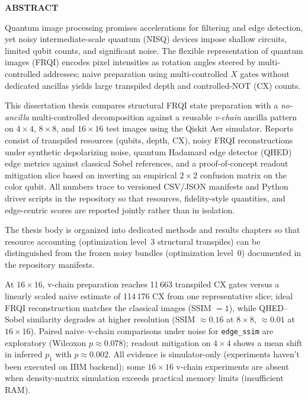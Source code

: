 \thispagestyle{abstractpagestyle}

\vspace*{36pt}

\begin{center}
    \textbf{\fontsize{20pt}{24pt} \selectfont ABSTRACT}
\end{center}

\vspace{24pt}

Quantum image processing promises accelerations for filtering and edge detection, yet noisy intermediate-scale quantum (NISQ) devices impose shallow circuits, limited qubit counts, and significant noise. The flexible representation of quantum images (FRQI) encodes pixel intensities as rotation angles steered by multi-controlled addresses; naive preparation using multi-controlled $X$ gates without dedicated ancillas yields large transpiled depth and controlled-NOT (CX) counts.

This dissertation thesis compares structural FRQI state preparation with a \emph{no-ancilla} multi-controlled decomposition against a reusable \emph{v-chain} ancilla pattern on $4\times 4$, $8\times 8$, and $16\times 16$ test images using the Qiskit Aer simulator. Reports consist of transpiled resources (qubits, depth, CX), noisy FRQI reconstructions under synthetic depolarizing noise, quantum Hadamard edge detector (QHED) edge metrics against classical Sobel references, and a proof-of-concept readout mitigation slice based on inverting an empirical $2\times 2$ confusion matrix on the color qubit. All numbers trace to versioned CSV/JSON manifests and Python driver scripts in the repository so that resources, fidelity-style quantities, and edge-centric scores are reported jointly rather than in isolation.

The thesis body is organized into dedicated methods and results chapters so that resource accounting (optimization level~3 structural transpiles) can be distinguished from the frozen noisy bundles (optimization level~0) documented in the repository manifests.

At $16\times 16$, v-chain preparation reaches 11\,663 transpiled CX gates versus a linearly scaled naive estimate of 114\,176 CX from one representative slice; ideal FRQI reconstruction matches the classical images (SSIM $=1$), while QHED--Sobel similarity degrades at higher resolution (SSIM $\approx 0.16$ at $8\times 8$, $\approx 0.01$ at $16\times 16$). Paired naive--v-chain comparisons under noise for \texttt{edge\_ssim} are exploratory (Wilcoxon $p\approx 0.078$); readout mitigation on $4\times 4$ shows a mean shift in inferred $p_1$ with $p\approx 0.002$. All evidence is simulator-only (experiments haven't been executed on IBM backend); some $16\times 16$ v-chain experiments are absent when density-matrix simulation exceeds practical memory limits (insufficient RAM).

\vfill
